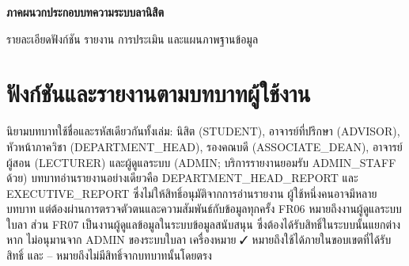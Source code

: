 \begin{center}\textbf{ภาคผนวกประกอบบทความระบบลานิสิต}
\end{center}
รายละเอียดฟังก์ชัน รายงาน การประเมิน และแผนภาพฐานข้อมูล
\appendix
\renewcommand{\thesection}{\ifcase\value{section}\or ก\or ข\or ค\or
ง\or จ\or ฉ\or ช\or ซ\fi}
\section{ฟังก์ชันและรายงานตามบทบาทผู้ใช้งาน}
นิยามบทบาทใช้ชื่อและรหัสเดียวกันทั้งเล่ม: นิสิต (STUDENT),
อาจารย์ที่ปรึกษา (ADVISOR), หัวหน้าภาควิชา (DEPARTMENT\_HEAD),
รองคณบดี (ASSOCIATE\_DEAN), อาจารย์ผู้สอน (LECTURER) และผู้ดูแลระบบ
(ADMIN; บริการรายงานยอมรับ ADMIN\_STAFF ด้วย)
บทบาทอ่านรายงานอย่างเดียวคือ DEPARTMENT\_HEAD\_REPORT และ
EXECUTIVE\_REPORT ซึ่งไม่ให้สิทธิ์อนุมัติจากการอ่านรายงาน
ผู้ใช้หนึ่งคนอาจมีหลายบทบาท
แต่ต้องผ่านการตรวจตัวตนและความสัมพันธ์กับข้อมูลทุกครั้ง
FR06 หมายถึงงานผู้ดูแลระบบใบลา ส่วน FR07
เป็นงานผู้ดูแลข้อมูลในระบบข้อมูลสนับสนุน
ซึ่งต้องได้รับสิทธิ์ในระบบนั้นแยกต่างหาก ไม่อนุมานจาก ADMIN
ของระบบใบลา เครื่องหมาย {✓}
หมายถึงใช้ได้ภายในขอบเขตที่ได้รับสิทธิ์ และ --
หมายถึงไม่มีสิทธิ์จากบทบาทนั้นโดยตรง
\begingroup
\setlength{\tabcolsep}{2pt}
\renewcommand{\arraystretch}{1.15}
